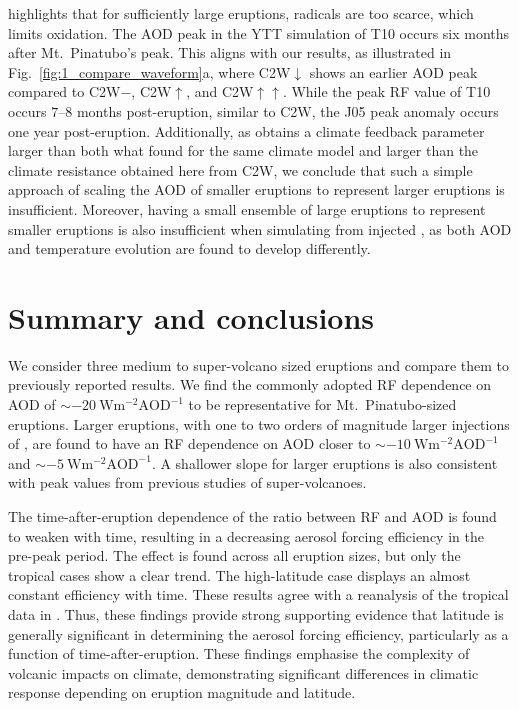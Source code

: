 \documentclass[draft]{agujournal2019}
\begin{document}
 highlights that for sufficiently large eruptions,  radicals
are too scarce, which limits  oxidation. The AOD peak in the YTT simulation of
T10 occurs six months after Mt.\ Pinatubo's peak. This aligns with our results, as
illustrated in Fig.~\ref{fig:1_compare_waveform}a, where C2W\(\downarrow\) shows an
earlier AOD peak compared to C2W\(-\), C2W\(\uparrow\), and C2W\(\uparrow\uparrow\).
While the peak RF value of T10 occurs \(7\)--\(8\) months post-eruption, similar to C2W,
the J05 peak anomaly occurs one year post-eruption. Additionally, as 
obtains a climate feedback parameter larger than both what  found for
the same climate model and larger than the climate resistance obtained here from C2W, we
conclude that such a simple approach of scaling the AOD of smaller eruptions to
represent larger eruptions is insufficient. Moreover, having a small ensemble of large
eruptions to represent smaller eruptions is also insufficient when simulating from
injected , as both AOD and temperature evolution are found to develop
differently.

\section{Summary and conclusions}\label{sec:conclusions}

We consider three medium to super-volcano sized eruptions and compare them to previously
reported results. We find the commonly adopted RF dependence on AOD of
\(\sim\SI{-20}{\watt\metre^{-2}\mathrm{AOD}^{-1}}\) to be representative for Mt.\
Pinatubo-sized eruptions. Larger eruptions, with one to two orders of magnitude larger
injections of \ce{SO2}, are found to have an RF dependence on AOD closer to
\(\sim\SI{-10}{\watt\metre^{-2}\mathrm{AOD}^{-1}}\) and
\(\sim\SI{-5}{\watt\metre^{-2}\mathrm{AOD}^{-1}}\). A shallower slope for larger
eruptions is also consistent with peak values from previous studies of super-volcanoes.

The time-after-eruption dependence of the ratio between RF and AOD is found to weaken
with time, resulting in a decreasing aerosol forcing efficiency in the pre-peak period.
The effect is found across all eruption sizes, but only the tropical cases show a clear
trend. The high-latitude case displays an almost constant efficiency with time. These
results agree with a reanalysis of the tropical data in \citeA{marshall2020dataset}.
Thus, these findings provide strong supporting evidence that latitude is generally
significant in determining the aerosol forcing efficiency, particularly as a function of
time-after-eruption. These findings emphasise the complexity of volcanic impacts on
climate, demonstrating significant differences in climatic response depending on
eruption magnitude and latitude.
\end{document}
